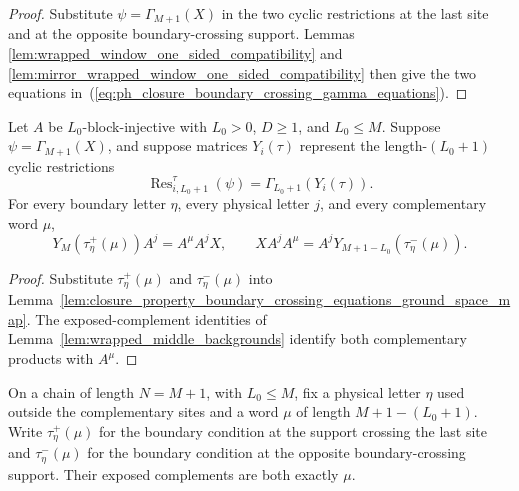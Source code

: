\begin{proof}
    \leanok
    Substitute $\psi=\Gamma_{M+1}(X)$ in the two cyclic restrictions at the
    last site and at the opposite boundary-crossing support. Lemmas
    \ref{lem:wrapped_window_one_sided_compatibility} and
    \ref{lem:mirror_wrapped_window_one_sided_compatibility} then give the two
    equations in~(\ref{eq:ph_closure_boundary_crossing_gamma_equations}).
\end{proof}

\begin{lemma}
    \label{lem:closure_property_boundary_one_sided_products_ground_space_map}
    \leanok
    Let $A$ be $L_0$-block-injective with $L_0>0$, $D\ge1$, and $L_0\le M$.
    Suppose $\psi=\Gamma_{M+1}(X)$, and suppose matrices $Y_i(\tau)$ represent
    the length-$(L_0+1)$ cyclic restrictions
    \[
        \operatorname{Res}^{\tau}_{i,L_0+1}(\psi)
        =
        \Gamma_{L_0+1}(Y_i(\tau)).
    \]
    For every boundary letter $\eta$, every physical letter $j$, and every
    complementary word $\mu$,
    \[
        Y_M(\tau^+_\eta(\mu))A^j
        =
        A^\mu A^j X,
        \qquad
        X A^j A^\mu
        =
        A^jY_{M+1-L_0}(\tau^-_\eta(\mu)).
    \]
\end{lemma}

\begin{proof}
    \leanok
    Substitute $\tau^+_\eta(\mu)$ and $\tau^-_\eta(\mu)$ into
    Lemma~\ref{lem:closure_property_boundary_crossing_equations_ground_space_map}.
    The exposed-complement identities of
    Lemma~\ref{lem:wrapped_middle_backgrounds} identify both complementary
    products with $A^\mu$.
\end{proof}

\begin{lemma}%
    \label{lem:wrapped_middle_backgrounds}
    \leanok
    On a chain of length $N=M+1$, with $L_0\le M$, fix a physical letter $\eta$
    used outside the complementary sites and a word $\mu$ of length
    $M+1-(L_0+1)$. Write $\tau^+_\eta(\mu)$ for the boundary condition at the
    support crossing the last site and $\tau^-_\eta(\mu)$ for the boundary
    condition at the opposite boundary-crossing support. Their exposed complements
    are both exactly $\mu$.
\end{lemma}

